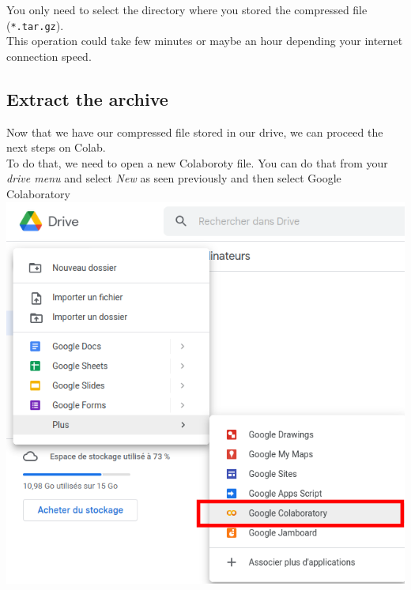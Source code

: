 \documentclass[10pt,a4paper]{article}
\newcommand{\code}[1]{\colorbox{light-gray}{\texttt{#1}}}
\begin{document}
You only need to select the directory where you stored the compressed file (\code{*.tar.gz}).\\
This operation could take few minutes or maybe an hour depending your internet connection speed.\\

\subsection{Extract the archive}
Now that we have our compressed file stored in our drive, we can proceed the next steps on Colab.\\
To do that, we need to open a new Colaboroty file. You can do that from your \textit{drive menu} and select \textit{New} as seen previously and then select Google Colaboratory\\
\includegraphics[scale=0.4]{newColab.png}\\
\end{document}
